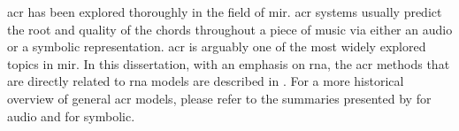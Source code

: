 

\gls{acr} has been explored thoroughly in the field of
\gls{mir}. \gls{acr} systems usually predict the root and
quality of the chords throughout a piece of music via either
an audio or a symbolic representation. \gls{acr} is arguably
one of the most widely explored topics in \gls{mir}. In this
dissertation, with an emphasis on \gls{rna}, the \gls{acr}
methods that are directly related to \gls{rna} models are
described in . For
a more historical overview of general \gls{acr} models,
please refer to the summaries presented by
\textcite{pauwels201920} for audio and
\textcite[58--88]{ju2021addressing} for symbolic.

